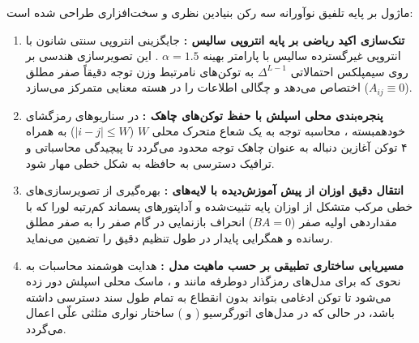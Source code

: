 ماژول  بر پایه تلفیق نوآورانه سه رکن بنیادین نظری و سخت‌افزاری طراحی شده است:
\begin{enumerate}
    \item \textbf{تنک‌سازی اکید ریاضی بر پایه انتروپی سالیس :} جایگزینی انتروپی سنتی شانون با انتروپی غیرگسترده سالیس با پارامتر بهینه $\alpha = 1.5$ . این تصویرسازی هندسی بر روی سیمپلکس احتمالاتی $\Delta^{L-1}$ به توکن‌های نامرتبط وزن توجه دقیقاً صفر مطلق ($A_{ij} \equiv 0$) اختصاص می‌دهد و چگالی اطلاعات را در هسته معنایی متمرکز می‌سازد.
    \item \textbf{پنجره‌بندی محلی اسپلش با حفظ توکن‌های چاهک :} در سناریوهای رمزگشای خودهمبسته ، محاسبه توجه به یک شعاع متحرک محلی $W$ ($|i - j| \le W$) به همراه ۴ توکن آغازین دنباله به عنوان چاهک توجه  محدود می‌گردد تا پیچیدگی محاسباتی و ترافیک دسترسی به حافظه به شکل خطی مهار شود.
    \item \textbf{انتقال دقیق اوزان از پیش آموزش‌دیده با لایه‌های :} بهره‌گیری از تصویرسازی‌های خطی مرکب متشکل از اوزان پایه تثبیت‌شده  و آداپتورهای پسماند کم‌رتبه لورا  که با مقداردهی اولیه صفر ($BA = 0$) انحراف بازنمایی در گام صفر را به صفر مطلق رسانده و همگرایی پایدار در طول تنظیم دقیق را تضمین می‌نماید.
    \item \textbf{مسیریابی ساختاری تطبیقی بر حسب ماهیت مدل :} هدایت هوشمند محاسبات به نحوی که برای مدل‌های رمزگذار دوطرفه  مانند  و ، ماسک محلی اسپلش دور زده می‌شود تا توکن ادغامی \lr{[CLS]} بتواند بدون انقطاع به تمام طول سند دسترسی داشته باشد، در حالی که در مدل‌های اتورگرسیو ( و ) ساختار نواری مثلثی علّی اعمال می‌گردد.
\end{enumerate}

